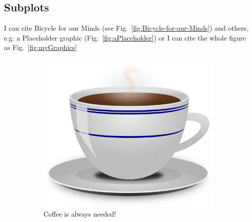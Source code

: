 \begin{landscape}

\section*{Subplots}
I can cite Bicycle for our Minds (see Fig.~\ref{fig:Bicycle-for-our-Minds}) and others, e.g. a Placeholder graphic (Fig.~\ref{fig:aPlaceholder}) or I can cite the whole figure as Fig.~\ref{fig:myGraphics}

\begin{figure}
  \centering
  \begin{subfigure}[b]{0.3\textwidth}
    \includegraphics[width=\textwidth]{Cup-of-Coffee}
    \caption{Coffee is always needed!}
    \label{fig:Cup-of-Coffee}   
  \end{subfigure}             
  \begin{subfigure}[b]{0.3\textwidth}

\end{subfigure}
\end{figure}
\end{landscape}
